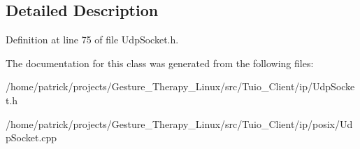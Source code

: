 \subsection{Detailed Description}


Definition at line 75 of file Udp\+Socket.\+h.



The documentation for this class was generated from the following files\+:\begin{DoxyCompactItemize}
\item 
/home/patrick/projects/\+Gesture\+\_\+\+Therapy\+\_\+\+Linux/src/\+Tuio\+\_\+\+Client/ip/Udp\+Socket.\+h\item 
/home/patrick/projects/\+Gesture\+\_\+\+Therapy\+\_\+\+Linux/src/\+Tuio\+\_\+\+Client/ip/posix/Udp\+Socket.\+cpp\end{DoxyCompactItemize}
